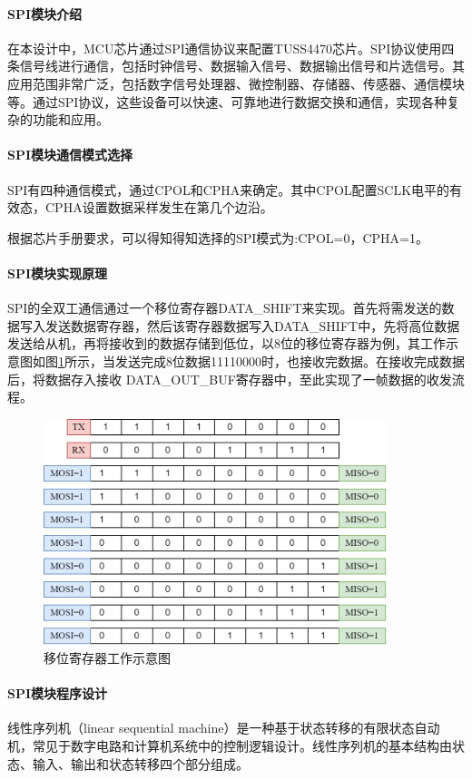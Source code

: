 \paragraph{SPI模块介绍}
在本设计中，MCU芯片通过SPI通信协议来配置TUSS4470芯片。SPI协议使用四条信号线进行通信，包括时钟信号、数据输入信号、数据输出信号和片选信号。其应用范围非常广泛，包括数字信号处理器、微控制器、存储器、传感器、通信模块等。通过SPI协议，这些设备可以快速、可靠地进行数据交换和通信，实现各种复杂的功能和应用。

\paragraph{SPI模块通信模式选择}
SPI有四种通信模式，通过CPOL和CPHA来确定。其中CPOL配置SCLK电平的有效态，CPHA设置数据采样发生在第几个边沿。\par
根据芯片手册要求，可以得知得知选择的SPI模式为:CPOL=0，CPHA=1。
\noindent
\paragraph{SPI模块实现原理}
SPI的全双工通信通过一个移位寄存器DATA\_SHIFT来实现。首先将需发送的数据写入发送数据寄存器，然后该寄存器数据写入DATA\_SHIFT中，先将高位数据发送给从机，再将接收到的数据存储到低位，以8位的移位寄存器为例，其工作示意图如图\ref{移位寄存器工作示意图}所示，当发送完成8位数据11110000时，也接收完数据。在接收完成数据后，将数据存入接收 DATA\_OUT\_BUF寄存器中，至此实现了一帧数据的收发流程。
\begin{figure}[ht]
	\centering
	\includegraphics[width=10cm]{figure/DATA_SHIFT.png}
	\caption{移位寄存器工作示意图}
	\label{移位寄存器工作示意图}
\end{figure}

\newpage
\paragraph{SPI模块程序设计}
线性序列机（linear sequential machine）是一种基于状态转移的有限状态自动机，常见于数字电路和计算机系统中的控制逻辑设计。线性序列机的基本结构由状态、输入、输出和状态转移四个部分组成。

